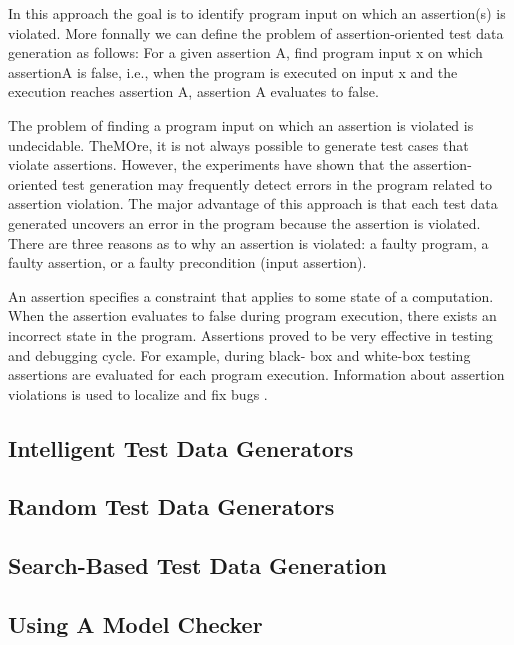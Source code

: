 In this approach the goal is to identify program input on which an assertion(s) is violated. More fonnally we can define the problem of
assertion-oriented test data generation as follows: For a given assertion A, find program input x on which assertionA is false, i.e., when the program is executed on input x and the execution reaches assertion A, assertion A evaluates to false.

The problem of finding a program input on which an assertion is violated is undecidable. TheMOre, it is not always possible to generate test cases that violate assertions. However, the experiments have shown that the assertion-oriented test generation may frequently detect errors in the program related to assertion violation. The major advantage of this approach is that each test data generated uncovers an error in the program because the assertion is violated. There are three reasons as to why an assertion is violated: a faulty program, a faulty assertion, or a faulty precondition (input assertion).

An assertion specifies a constraint that applies to some state of a computation. When the assertion evaluates to false during program execution, there exists an incorrect state in the program. Assertions proved to be very effective in testing and debugging cycle. For example, during black- box and white-box testing assertions are evaluated for each program execution. Information about assertion violations is used to localize and fix bugs \cite{korel1996assertion}.



\subsection{Intelligent Test Data Generators}


\subsection{Random Test Data Generators}



 
\subsection{Search-Based Test Data Generation}

\subsection{Using A Model Checker}
